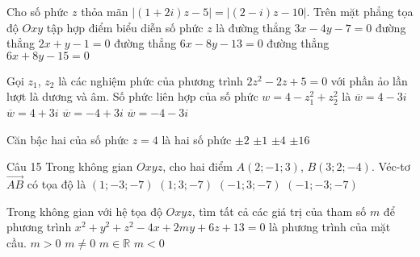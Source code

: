 \begin{ex}%
Cho số phức $z$ thỏa mãn $|(1+2i)z-5|=|(2-i)z-10|$. Trên mặt phẳng tọa độ $Oxy$ tập hợp điểm biểu diễn số phức $z$ là
\choice
{đường thẳng $3x-4y-7=0$}
{đường thẳng $2x+y-1=0$}
{\True đường thẳng $6x-8y-13=0$}
{đường thẳng $6x+8y-15=0$}
\end{ex}

\begin{ex}%
Gọi $z_1$, $z_2$ là các nghiệm phức của phương trình $2z^2-2z+5=0$ với phần ảo lần lượt là dương và âm. Số phức liên hợp của số phức $w=4-z_1^2+z_2^2$ là
\choice
{$\overline{w}=4-3i$}
{\True $\overline{w}=4+3i$}
{$\overline{w}=-4+3i$}
{$\overline{w}=-4-3i$}
\end{ex}

\begin{ex}%
Căn bậc hai của số phức $z=4$ là hai số phức
\choice
{\True $\pm 2$}
{$\pm 1$}
{$\pm 4$}
{$\pm 16$}
\end{ex}

\begin{ex}Câu 15%
Trong không gian $Oxyz$, cho hai điểm $A(2;-1;3)$, $B(3;2;-4)$. Véc-tơ $\overrightarrow{AB}$ có tọa độ là
\choice
{$(1;-3;-7)$}
{\True $(1;3;-7)$}
{$(-1;3;-7)$}
{$(-1;-3;-7)$}
\end{ex}

\begin{ex}%
Trong không gian với hệ tọa độ $O x y z$, tìm tất cả các giá trị của tham số $m$ để phương trình $x^{2}+y^{2}+z^{2}-4 x+2 m y+6 z+13=0$ là phương trình của mặt cầu.
\choice
{$m>0$}
{\True $m \neq 0$}
{$m \in \mathbb{R}$}
{$m<0$}
\end{ex}


